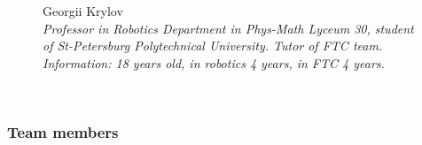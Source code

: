 \begin{figure}[H]
	\begin{minipage}{0.47\linewidth}
		Georgii Krylov \\ 
		\emph{Professor in Robotics Department in Phys-Math Lyceum 30, student of St-Petersburg Polytechnical University. Tutor of FTC team. \\}
		\emph{Information: 18 years old, in robotics 4 years, in FTC 4 years.}
	\end{minipage}	
	\hfill
	\begin{minipage}[h]{0.47\linewidth}
		\\
	\end{minipage}
	\vfill 
\end{figure}

\fillpage

\subsubsection{Team members}

